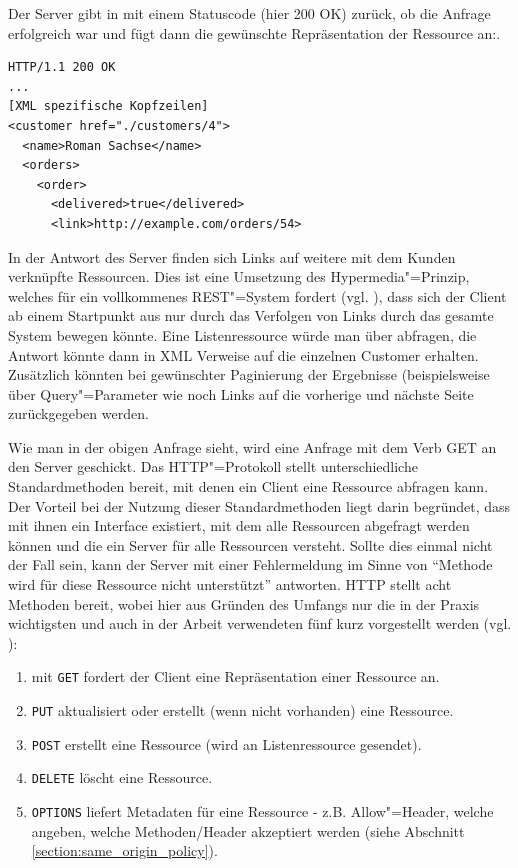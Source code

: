 Der Server gibt in mit einem Statuscode (hier 200 OK) zurück, ob die Anfrage erfolgreich war und fügt dann die gewünschte Repräsentation der Ressource an:.
\begin{lstlisting}
HTTP/1.1 200 OK
...
[XML spezifische Kopfzeilen]
<customer href="./customers/4">
  <name>Roman Sachse</name>
  <orders>
    <order>
      <delivered>true</delivered>
      <link>http://example.com/orders/54>
\end{lstlisting}
In der Antwort des Server finden sich Links auf weitere mit dem Kunden verknüpfte Ressourcen. Dies ist eine Umsetzung des Hypermedia"=Prinzip, welches für ein vollkommenes REST"=System fordert (vgl. \cite{tilkovrest}), dass sich der Client ab einem Startpunkt aus nur durch das Verfolgen von Links durch das gesamte System bewegen könnte. Eine Listenressource würde man über  abfragen, die Antwort könnte dann in XML Verweise auf die einzelnen Customer erhalten. Zusätzlich könnten bei gewünschter Paginierung der Ergebnisse (beispielsweise über Query"=Parameter wie  noch Links auf die vorherige und nächste Seite zurückgegeben werden.

Wie man in der obigen Anfrage sieht, wird eine Anfrage mit dem Verb GET an den Server geschickt. Das HTTP"=Protokoll stellt unterschiedliche Standardmethoden bereit, mit denen ein Client eine Ressource abfragen kann. Der Vorteil bei der Nutzung dieser Standardmethoden liegt darin begründet, dass mit ihnen ein Interface existiert, mit dem alle Ressourcen abgefragt werden können und die ein Server für alle Ressourcen versteht. Sollte dies einmal nicht der Fall sein, kann der Server mit einer Fehlermeldung im Sinne von "`Methode wird für diese Ressource nicht unterstützt"' antworten. HTTP stellt acht Methoden bereit, wobei hier aus Gründen des Umfangs nur die in der Praxis wichtigsten und auch in der Arbeit verwendeten fünf kurz vorgestellt werden (vgl. \cite{tilkovrest}):
\begin{enumerate}
 \item mit \texttt{GET} fordert der Client eine Repräsentation einer Ressource an.
 \item \texttt{PUT} aktualisiert oder erstellt (wenn nicht vorhanden) eine Ressource. 
 \item \texttt{POST} erstellt eine Ressource (wird an Listenressource gesendet).
 \item \texttt{DELETE} löscht eine Ressource.
 \item \texttt{OPTIONS} liefert Metadaten für eine Ressource - z.B. Allow"=Header, welche angeben, welche Methoden/Header akzeptiert werden (siehe Abschnitt \ref{section:same_origin_policy}).
\end{enumerate}

